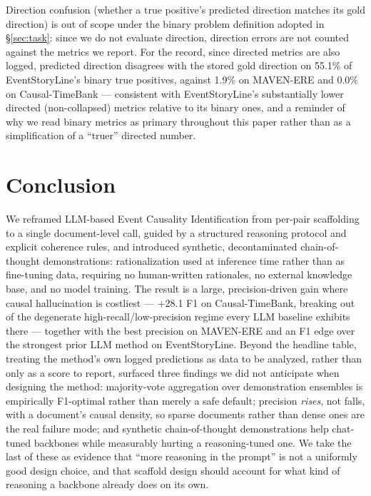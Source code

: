 \documentclass[11pt]{article}
\begin{document}
Direction confusion (whether a true positive's predicted direction matches its
gold direction) is out of scope under the binary problem definition adopted in
\S\ref{sec:task}: since we do not evaluate direction, direction errors are not
counted against the metrics we report. For the record, since directed metrics are
also logged, predicted direction disagrees with the stored gold direction on
55.1\% of EventStoryLine's binary true positives, against 1.9\% on MAVEN-ERE and
0.0\% on Causal-TimeBank --- consistent with EventStoryLine's substantially lower
directed (non-collapsed) metrics relative to its binary ones, and a reminder of
why we read binary metrics as primary throughout this paper rather than as a
simplification of a ``truer'' directed number.

\section{Conclusion}
\label{sec:conclusion}

We reframed LLM-based Event Causality Identification from per-pair scaffolding to
a single document-level call, guided by a structured reasoning protocol and
explicit coherence rules, and introduced synthetic, decontaminated
chain-of-thought demonstrations: rationalization used at inference time rather
than as fine-tuning data, requiring no human-written rationales, no external
knowledge base, and no model training. The result is a large, precision-driven
gain where causal hallucination is costliest --- +28.1 F1 on Causal-TimeBank,
breaking out of the degenerate high-recall/low-precision regime every LLM baseline
exhibits there --- together with the best precision on MAVEN-ERE and an F1 edge
over the strongest prior LLM method on EventStoryLine. Beyond the headline table,
treating the method's own logged predictions as data to be analyzed, rather than
only as a score to report, surfaced three findings we did not anticipate when
designing the method: majority-vote aggregation over demonstration ensembles is
empirically F1-optimal rather than merely a safe default; precision
\emph{rises}, not falls, with a document's causal density, so sparse documents
rather than dense ones are the real failure mode; and synthetic chain-of-thought
demonstrations help chat-tuned backbones while measurably hurting a
reasoning-tuned one. We take the last of these as evidence that ``more reasoning
in the prompt'' is not a uniformly good design choice, and that scaffold design
should account for what kind of reasoning a backbone already does on its own.
\end{document}
